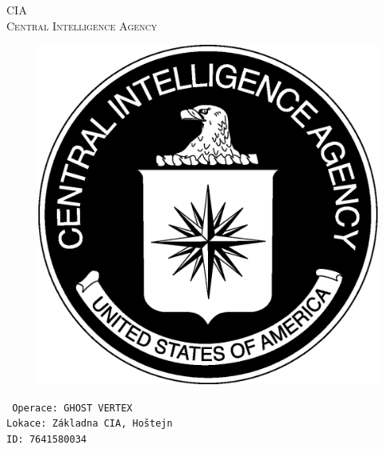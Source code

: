 \documentclass[a4paper, \fontheight]{article}
\begin{document}
	\begin{titlepage}
		\begin{center}		
			\textsc{{\fontsize{80}{0}\selectfont CIA}\\[2em]
				\Huge Central Intelligence Agency\\[2.5em]}
				
			\begin{figure}[H]
				\centering
				\includegraphics[scale=0.6]{sources/CIA_logo.eps}
			\end{figure}
		\end{center}	
		\vfill
		\noindent
		\texttt{\LARGE
				Operace: GHOST VERTEX\\[0.4em]
				Lokace: Základna CIA, Hoštejn\\[0.4em]
				ID: 7641580034}	
\end{titlepage} 
\end{document}
